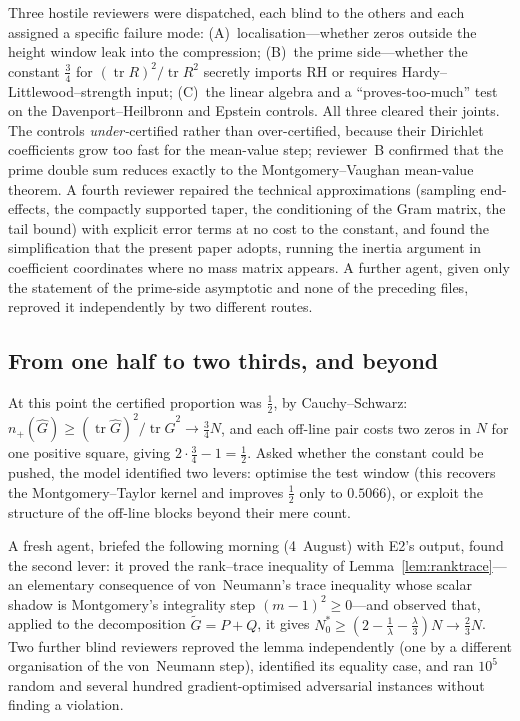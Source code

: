 \documentclass[11pt]{amsart}
\theoremstyle{definition}
\theoremstyle{remark}
\numberwithin{equation}{section}
\DeclareMathOperator{\tr}{tr}
\newcommand{\wh}{\widehat}
\newcommand{\Gt}{\widetilde{G}}
\newcommand{\npl}{n_{+}}
\begin{document}
Three hostile reviewers were dispatched, each blind to the others and each assigned a specific failure mode: (A)~localisation---whether zeros outside the height window leak into the compression; (B)~the prime side---whether the constant $\tfrac34$ for $(\tr R)^2/\tr R^2$ secretly imports RH or requires Hardy--Littlewood--strength input; (C)~the linear algebra and a ``proves-too-much'' test on the Davenport--Heilbronn and Epstein controls. All three cleared their joints. The controls \emph{under-}certified rather than over-certified, because their Dirichlet coefficients grow too fast for the mean-value step; reviewer~B confirmed that the prime double sum reduces exactly to the Montgomery--Vaughan mean-value theorem. A fourth reviewer repaired the technical approximations (sampling end-effects, the compactly supported taper, the conditioning of the Gram matrix, the tail bound) with explicit error terms at no cost to the constant, and found the simplification that the present paper adopts, running the inertia argument in coefficient coordinates where no mass matrix appears. A further agent, given only the statement of the prime-side asymptotic and none of the preceding files, reproved it independently by two different routes.

\subsection{From one half to two thirds, and beyond}\label{app:twothirds}

At this point the certified proportion was $\tfrac12$, by Cauchy--Schwarz: $\npl(\wh G)\ge(\tr\wh G)^2/\tr\wh G^2\to\tfrac34N$, and each off-line pair costs two zeros in $N$ for one positive square, giving $2\cdot\tfrac34-1=\tfrac12$. Asked whether the constant could be pushed, the model identified two levers: optimise the test window (this recovers the Montgomery--Taylor kernel and improves $\tfrac12$ only to $0.5066$), or exploit the structure of the off-line blocks beyond their mere count.

A fresh agent, briefed the following morning (4~August) with E2's output, found the second lever: it proved the rank--trace inequality of Lemma~\ref{lem:ranktrace}---an elementary consequence of von~Neumann's trace inequality whose scalar shadow is Montgomery's integrality step $(m-1)^2\ge0$---and observed that, applied to the decomposition $\Gt=P+Q$, it gives $N_0^{*}\ge(2-\tfrac1\lambda-\tfrac\lambda3)N\to\tfrac23N$. Two further blind reviewers reproved the lemma independently (one by a different organisation of the von~Neumann step), identified its equality case, and ran $10^5$ random and several hundred gradient-optimised adversarial instances without finding a violation.
\end{document}
